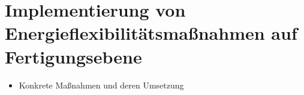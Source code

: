 \section{Implementierung von Energieflexibilitätsmaßnahmen auf Fertigungsebene}
\label{ch_04Implementierung von Energieflexibilitätsmaßnahmen auf Fertigungsebene}
\begin{itemize}
	\item Konkrete Maßnahmen und deren Umsetzung
\end{itemize}
